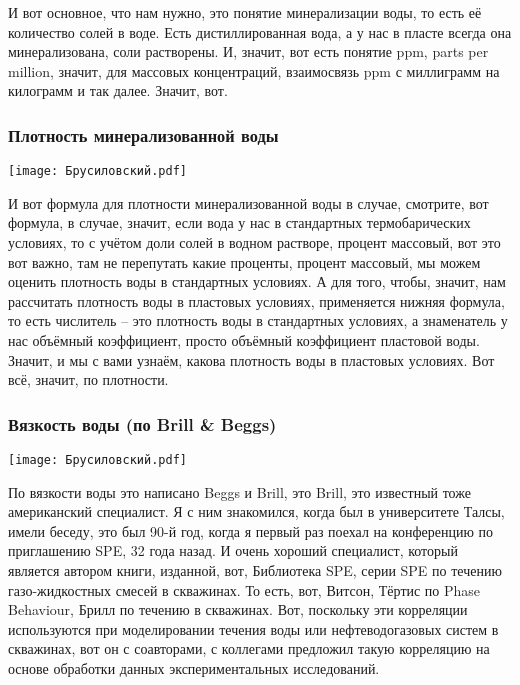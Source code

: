 \documentclass[main.tex]{subfiles}
\begin{document}
И вот основное, что нам нужно, это понятие минерализации воды, то есть её количество солей в воде.
Есть дистиллированная вода, а у нас в пласте всегда она минерализована, соли растворены.
И, значит, вот есть понятие ppm, parts per million, значит, для массовых концентраций, взаимосвязь ppm с миллиграмм на килограмм и так далее.
Значит, вот.

\subsubsection{Плотность минерализованной воды}

\begin{center}
\texttt{[image: Брусиловский.pdf]}
\end{center}

И вот формула для плотности минерализованной воды в случае, смотрите, вот формула, в случае, значит, если вода у нас в стандартных термобарических условиях, то с учётом доли солей в водном растворе, процент массовый, вот это вот важно, там не перепутать какие проценты, процент массовый, мы можем оценить плотность воды в стандартных условиях.
А для того, чтобы, значит, нам рассчитать плотность воды в пластовых условиях, применяется нижняя формула, то есть числитель – это плотность воды в стандартных условиях, а знаменатель у нас объёмный коэффициент, просто объёмный коэффициент пластовой воды.
Значит, и мы с вами узнаём, какова плотность воды в пластовых условиях.
Вот всё, значит, по плотности.

\subsubsection{Вязкость воды (по Brill \& Beggs)}

\begin{center}
\texttt{[image: Брусиловский.pdf]}
\end{center}

По вязкости воды это написано Beggs и Brill, это Brill, это известный тоже американский специалист.
Я с ним знакомился, когда был в университете Талсы, имели беседу, это был 90-й год, когда я первый раз поехал на конференцию по приглашению SPE, 32 года назад.
И очень хороший специалист, который является автором книги, изданной, вот, Библиотека SPE, серии SPE по течению газо-жидкостных смесей в скважинах.
То есть, вот, Витсон, Тёртис по Phase Behaviour, Брилл по течению в скважинах.
Вот, поскольку эти корреляции используются при моделировании течения воды или нефтеводогазовых систем в скважинах, вот он с соавторами, с коллегами предложил такую корреляцию на основе обработки данных экспериментальных исследований.
\end{document}
